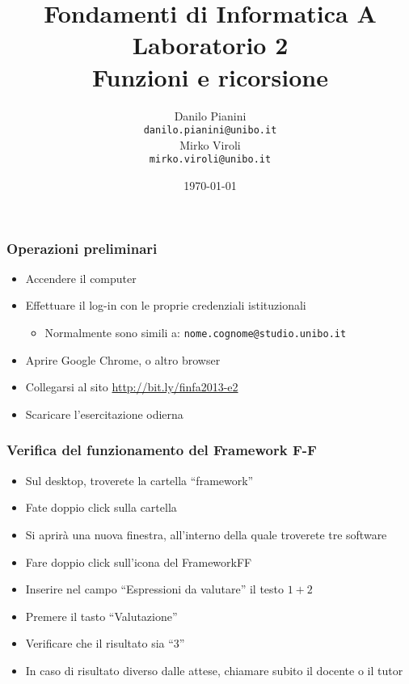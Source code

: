 \documentclass{beamer}
\begin{document}
\title[Lab1 - FV]{Fondamenti di Informatica A \\ Laboratorio 2 \\ Funzioni e ricorsione}
\author[Danilo Pianini]{Danilo Pianini\\\texttt{danilo.pianini@unibo.it} \\ \vspace{3pt} Mirko Viroli\\\texttt{mirko.viroli@unibo.it} }
\date[\today]{\today}

\frame{\titlepage} 

\begin{frame}
\frametitle{Operazioni preliminari}
\begin{itemize}
 \item Accendere il computer
 \item Effettuare il log-in con le proprie credenziali istituzionali
  \begin{itemize}
    \item Normalmente sono simili a: \texttt{nome.cognome@studio.unibo.it}
  \end{itemize}
 \item Aprire Google Chrome, o altro browser
 \item Collegarsi al sito \url{http://bit.ly/finfa2013-e2}
 \item Scaricare l'esercitazione odierna
\end{itemize}
\end{frame}

\begin{frame}
\frametitle{Verifica del funzionamento del Framework F-F}
\begin{itemize}
 \item Sul desktop, troverete la cartella ``framework''
 \item Fate doppio click sulla cartella
 \item Si aprirà una nuova finestra, all'interno della quale troverete tre software
 \item Fare doppio click sull'icona del FrameworkFF
 \item Inserire nel campo ``Espressioni da valutare'' il testo \texttt{$1+2$}
 \item Premere il tasto ``Valutazione''
 \item Verificare che il risultato sia ``3''
 \item In caso di risultato diverso dalle attese, chiamare subito il docente o il tutor
\end{itemize}
\end{frame}
\end{document}
